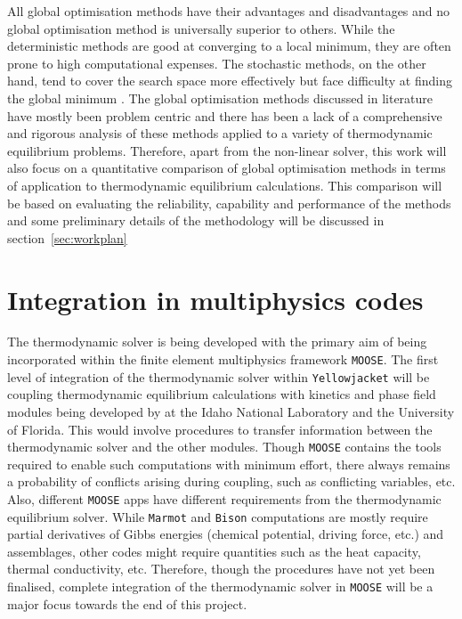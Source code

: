 	  All global optimisation methods have their advantages and disadvantages and no global optimisation method is universally superior to others. While the deterministic methods are good at converging to a local minimum, they are often prone to high computational expenses. The stochastic methods, on the other hand, tend to cover the search space more effectively but face difficulty at finding the global minimum \cite{Piro16}. The global optimisation methods discussed in literature have mostly been problem centric and there has been a lack of a comprehensive and rigorous analysis of these methods applied to a variety of thermodynamic equilibrium problems. Therefore, apart from the non-linear solver, this work will also focus on a quantitative comparison of global optimisation methods in terms of application to thermodynamic equilibrium calculations. This comparison will be based on evaluating the reliability, capability and performance of the methods and some preliminary details of the methodology will be discussed in section~\ref{sec:workplan}


\section{Integration in multiphysics codes}
	The thermodynamic solver is being developed with the primary aim of being incorporated within the  finite element multiphysics framework \texttt{MOOSE}. The first level of integration of the thermodynamic solver within \texttt{Yellowjacket} will be coupling thermodynamic equilibrium calculations with kinetics and phase field modules being developed by at the Idaho National Laboratory and the University of Florida. This would involve procedures to transfer information between the thermodynamic solver and the other modules. Though  \texttt{MOOSE} contains the tools required to enable such computations with minimum effort, there always remains a probability of conflicts arising during coupling, such as conflicting variables, etc. Also, different \texttt{MOOSE} apps have different requirements from the thermodynamic equilibrium solver. While \texttt{Marmot} and \texttt{Bison} computations are mostly require partial derivatives of Gibbs energies (chemical potential, driving force, etc.) and assemblages, other codes might require quantities such as the heat capacity, thermal conductivity, etc.  Therefore, though the procedures have not yet been finalised, complete integration of the thermodynamic solver in \texttt{MOOSE} will be a major focus towards the end of this project.



